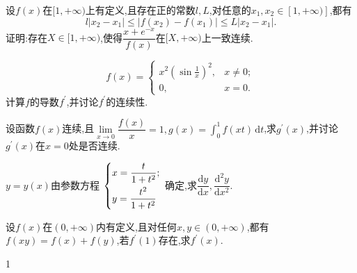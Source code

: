 \documentclass[UTF8,a4paper]{ctexart}
\begin{document}
\begin{thinking}[吉林大学,2023]
设$ f(x) $在$ [1,+\infty) $上有定义,且存在正的常数$ l,L $,对任意的$ x_1,x_2\in [1,+\infty)]$,都有
\[
l\lvert x_2-x_1\rvert\leq\lvert f(x_2)-f(x_1)\rvert\leq L\lvert x_2-x_1\rvert .
\]
证明:存在$ X\in[1,+\infty) $,使得$ \dfrac{x+e^{-x}}{f(x)} $在$ [X,+\infty)$上一致连续.
\end{thinking}
\newpage
\begin{example}[中国科学技术大学,2023]
	\begin{equation*}
		f(x)=
		\begin{cases}
			x^2\left (\sin \frac1x\right )^2,&x\neq0;\\
			0,&x=0.
		\end{cases}
	\end{equation*}
计算$f$的导数$f^{\prime}$,并讨论$f^{\prime}$的连续性.
\end{example}
\begin{example}[北京科技大学,2023]
	设函数$ f(x) $连续,且$ \lim\limits_{x\to 0}\dfrac{f(x)}{x}=1,g(x)=\int_{0}^{1}f(xt) \,\mathrm{d}t$,求$ g^{\prime}(x) $,并讨论$ g^{\prime}(x) $在$ x=0 $处是否连续.
\end{example}
\newpage
\begin{thinking}[华东师范大学,2023]
$y=y(x)$由参数方程
	$\left\{\begin{lgathered}
		x=\dfrac{t}{1+t^2};\\
		y=\dfrac{t^2}{1+t^2}
	\end{lgathered}\right.$
确定,求$\dfrac{\mathrm{d}y}{\mathrm{d}x},\dfrac{\mathrm{d}^2y}{\mathrm{d}x^2}$.
\end{thinking}
\begin{thinking}[重庆大学,2023]
	设$ f(x) $在$ (0,+\infty) $内有定义,且对任何$ x,y\in (0,+\infty) $,都有$ f(xy) =f(x)+f(y)$,若$ f^{\prime}(1) $存在,求$ f^{\prime}(x) $.
\end{thinking}
\newpage
\begin{example}
    1
\end{example}
\end{document}
